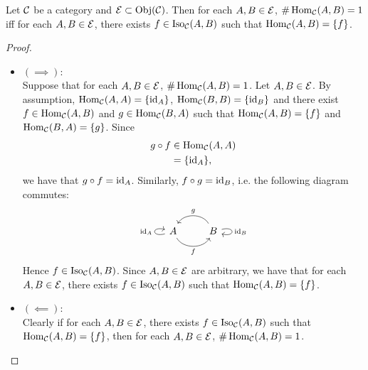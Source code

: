\documentclass{book}
\begin{document}
	\begin{ex} 
		Let $\mathcal{C}$ be a category and $\mathcal{E} \subset \operatorname{Obj}(\mathcal{C})$. Then for each $A,B \in \mathcal{E}$, $\# \operatorname{Hom}_{\mathcal{C}}(A, B) = 1$ iff for each $A, B \in \mathcal{E}$, there exists $f \in \operatorname{Iso}_{\mathcal{C}}(A, B)$ such that $\operatorname{Hom}_{\mathcal{C}}(A, B) = \{f\}$.
	\end{ex}
	
	\begin{proof}\
		\begin{itemize}
			\item $(\implies)$: \\
			Suppose that for each $A,B \in \mathcal{E}$, $\# \operatorname{Hom}_{\mathcal{C}}(A, B) = 1$. Let $A,B \in \mathcal{E}$. By assumption, $\operatorname{Hom}_{\mathcal{C}}(A, A) = \{\operatorname{id}_A\}$, $\operatorname{Hom}_{\mathcal{C}}(B, B) = \{\operatorname{id}_B\}$ and there exist $f \in \operatorname{Hom}_{\mathcal{C}}(A, B)$ and $g \in \operatorname{Hom}_{\mathcal{C}}(B, A)$ such that $\operatorname{Hom}_{\mathcal{C}}(A, B) = \{f\}$ and $\operatorname{Hom}_{\mathcal{C}}(B, A) = \{g\}$. Since 
			\begin{align*}
				g \circ f
				& \in \operatorname{Hom}_{\mathcal{C}}(A, A) \\
				& = \{\operatorname{id}_A\},
			\end{align*}
			we have that $g \circ f = \operatorname{id}_A$. Similarly, $f \circ g = \operatorname{id}_B$, i.e. the following diagram commutes:
			\[ 
			\begin{tikzcd}[baseline= 7]
				\arrow[loop left, "\id_A"] A \arrow[r, bend right= 60, "f", swap] & B \arrow[l, bend left=-60, "g", swap] \arrow[loop right, "\id_B"] \\
			\end{tikzcd}
			\]  
			Hence $f \in \operatorname{Iso}_{\mathcal{C}}(A,B)$. Since $A, B \in \mathcal{E}$ are arbitrary, we have that for each $A,B \in \mathcal{E}$, there exists $f \in \operatorname{Iso}_{\mathcal{C}}(A, B)$ such that $\operatorname{Hom}_{\mathcal{C}}(A, B) = \{f\}$.
			\item $(\impliedby)$: \\
			Clearly if for each $A, B \in \mathcal{E}$, there exists $f \in \operatorname{Iso}_{\mathcal{C}}(A, B)$ such that $\operatorname{Hom}_{\mathcal{C}}(A, B) = \{f\}$, then for each $A,B \in \mathcal{E}$, $\# \operatorname{Hom}_{\mathcal{C}}(A, B) = 1$.
		\end{itemize}
	\end{proof}
	
	
	
	
	
	
	
	
	
	
	
	
	
	
	
	
	
	
	
	
	
\end{document}
